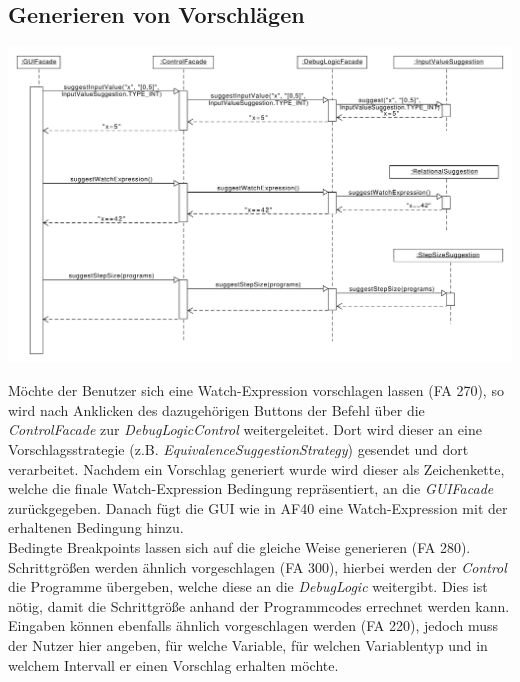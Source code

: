 \documentclass[parskip=full]{scrartcl}
\begin{document}
\subsection{Generieren von Vorschlägen}%
\begin{center}
\includegraphics[width=1.0\textwidth]{diagrammIdeenUmlet/SequenceDiagrams/seq_suggestions.pdf}
\end{center}
Möchte der Benutzer sich eine Watch-Expression vorschlagen lassen (FA 270), so wird nach Anklicken des dazugehörigen Buttons der Befehl über die \textit{ControlFacade} zur \textit{DebugLogicControl} weitergeleitet. 
Dort wird dieser an eine Vorschlagsstrategie (z.B. \textit{EquivalenceSuggestionStrategy}) gesendet und dort verarbeitet. 
Nachdem ein Vorschlag generiert wurde wird dieser als Zeichenkette, welche die finale Watch-Expression Bedingung repräsentiert, an die \textit{GUIFacade} zurückgegeben. 
Danach fügt die GUI wie in AF40 eine Watch-Expression mit der erhaltenen Bedingung hinzu.
\\
Bedingte Breakpoints lassen sich auf die gleiche Weise generieren (FA 280).
\\
Schrittgrößen werden ähnlich vorgeschlagen (FA 300), hierbei werden der \textit{Control} die Programme übergeben, welche diese an die \textit{DebugLogic} weitergibt. 
Dies ist nötig, damit die Schrittgröße anhand der Programmcodes errechnet werden kann.
\\
Eingaben können ebenfalls ähnlich vorgeschlagen werden (FA 220), jedoch muss der Nutzer hier angeben, für welche Variable, für welchen Variablentyp und in welchem Intervall er einen Vorschlag erhalten möchte.
\end{document}

